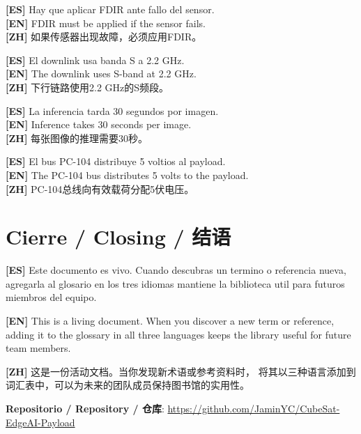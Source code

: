 \documentclass[11pt,a4paper]{report}
\begin{document}
\vspace{0.5em}
\noindent\textbf{[ES]} Hay que aplicar FDIR ante fallo del sensor.\\
\textbf{[EN]} FDIR must be applied if the sensor fails.\\
\textbf{[ZH]} 如果传感器出现故障，必须应用FDIR。

\vspace{0.5em}
\noindent\textbf{[ES]} El downlink usa banda S a 2.2 GHz.\\
\textbf{[EN]} The downlink uses S-band at 2.2 GHz.\\
\textbf{[ZH]} 下行链路使用2.2 GHz的S频段。

\vspace{0.5em}
\noindent\textbf{[ES]} La inferencia tarda 30 segundos por imagen.\\
\textbf{[EN]} Inference takes 30 seconds per image.\\
\textbf{[ZH]} 每张图像的推理需要30秒。

\vspace{0.5em}
\noindent\textbf{[ES]} El bus PC-104 distribuye 5 voltios al payload.\\
\textbf{[EN]} The PC-104 bus distributes 5 volts to the payload.\\
\textbf{[ZH]} PC-104总线向有效载荷分配5伏电压。

\chapter*{Cierre / Closing / 结语}

\noindent\textbf{[ES]} Este documento es vivo. Cuando descubras un termino
o referencia nueva, agregarla al glosario en los tres idiomas mantiene la
biblioteca util para futuros miembros del equipo.

\vspace{0.5em}
\noindent\textbf{[EN]} This is a living document. When you discover a new
term or reference, adding it to the glossary in all three languages keeps
the library useful for future team members.

\vspace{0.5em}
\noindent\textbf{[ZH]} 这是一份活动文档。当你发现新术语或参考资料时，
将其以三种语言添加到词汇表中，可以为未来的团队成员保持图书馆的实用性。

\vspace{2em}
\noindent
\textbf{Repositorio / Repository / 仓库}:
\url{https://github.com/JaminYC/CubeSat-EdgeAI-Payload}
\end{document}
